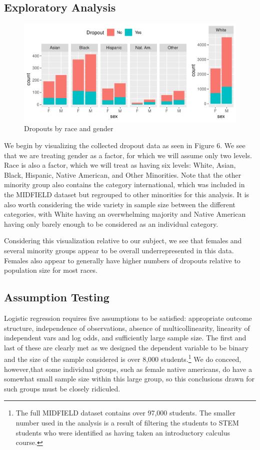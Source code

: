 \documentclass[]{article}
\begin{document}
\subsection{Exploratory Analysis}\label{exploratory-analysis}

\begin{figure}
\centering
\includegraphics{Stat_461_Final_Project_Report_files/figure-latex/comboplots-1.pdf}
\caption{Dropouts by race and gender}
\end{figure}

We begin by visualizing the collected dropout data as seen in Figure 6.
We see that we are treating gender as a factor, for which we will assume
only two levels. Race is also a factor, which we will treat as having
six levels: White, Asian, Black, Hispanic, Native American, and Other
Minorities. Note that the other minority group also contains the
category international, which was included in the MIDFIELD dataset but
regrouped to other minorities for this analysis. It is also worth
considering the wide variety in sample size between the different
categories, with White having an overwhelming majority and Native
American having only barely enough to be considered as an individual
category.

Considering this visualization relative to our subject, we see that
females and several minority groups appear to be overall
underrepresented in this data. Females also appear to generally have
higher numbers of dropouts relative to population size for most races.

\subsection{Assumption Testing}\label{assumption-testing}

Logistic regression requires five assumptions to be satisfied:
appropriate outcome structure, independence of observations, absence of
multicollinearity, linearity of independent vars and log odds, and
sufficiently large sample size. \cite{glmassumptions} The first and last
of these are clearly met as we designed the dependent variable to be
binary and the size of the sample considered is over 8,000
students.\footnote{The full MIDFIELD dataset contains over 97,000 students. The smaller number used in the analysis is a result of filtering the students to STEM students who were identified as having taken an introductory calculus course.}
We do conceed, however,that some individual groups, such as female
native americans, do have a somewhat small sample size within this large
group, so this conclusions drawn for such groups must be closely
ridiculed.
\end{document}
